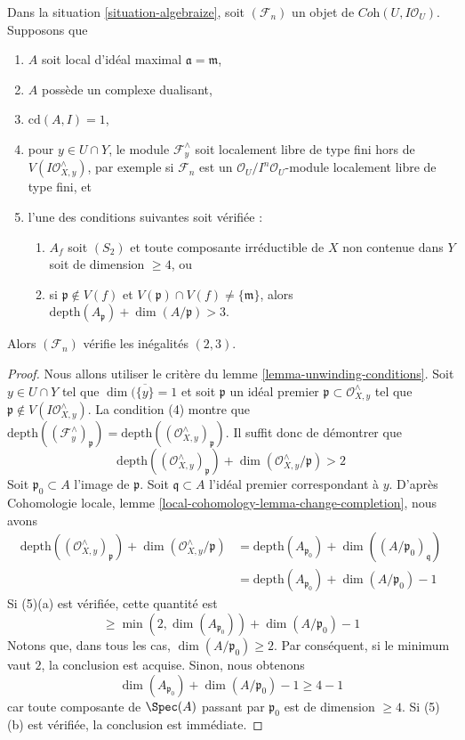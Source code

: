 \begin{lemma}
\label{lemma-unwinding-conditions-bis}
Dans la situation \ref{situation-algebraize}, soit $(\mathcal{F}_n)$ un objet
de $\textit{Coh}(U, I\mathcal{O}_U)$. Supposons que
\begin{enumerate}
\item $A$ soit local d'idéal maximal $\mathfrak a = \mathfrak m$,
\item $A$ possède un complexe dualisant,
\item $\text{cd}(A, I) = 1$,
\item pour $y \in U \cap Y$, le module $\mathcal{F}_y^\wedge$
soit localement libre de type fini hors de $V(I\mathcal{O}_{X, y}^\wedge)$,
par exemple si $\mathcal{F}_n$ est un
$\mathcal{O}_U/I^n\mathcal{O}_U$-module localement libre de type fini, et
\item l'une des conditions suivantes soit vérifiée :
\begin{enumerate}
\item $A_f$ soit $(S_2)$ et toute composante irréductible de $X$
non contenue dans $Y$ soit de dimension $\geq 4$, ou
\item si $\mathfrak p \not \in V(f)$ et
$V(\mathfrak p) \cap V(f) \not = \{\mathfrak m\}$, alors
$\text{depth}(A_\mathfrak p) + \dim(A/\mathfrak p) > 3$.
\end{enumerate}
\end{enumerate}
Alors $(\mathcal{F}_n)$ vérifie les inégalités $(2, 3)$.
\end{lemma}

\begin{proof}
Nous allons utiliser le critère du lemme \ref{lemma-unwinding-conditions}.
Soit $y \in U \cap Y$ tel que $\dim(\overline{\{y\}} = 1$ et soit
$\mathfrak p$ un idéal premier $\mathfrak p \subset \mathcal{O}_{X, y}^\wedge$ tel que
$\mathfrak p \not \in V(I\mathcal{O}_{X, y}^\wedge)$.
La condition (4) montre que
$\text{depth}((\mathcal{F}_y^\wedge)_\mathfrak p) =
\text{depth}((\mathcal{O}_{X, y}^\wedge)_\mathfrak p)$.
Il suffit donc de démontrer que
$$
\text{depth}((\mathcal{O}_{X, y}^\wedge)_\mathfrak p) +
\dim(\mathcal{O}_{X, y}^\wedge/\mathfrak p) > 2
$$
Soit $\mathfrak p_0 \subset A$ l'image de $\mathfrak p$.
Soit $\mathfrak q \subset A$ l'idéal premier correspondant à $y$.
D'après Cohomologie locale, lemme
\ref{local-cohomology-lemma-change-completion},
nous avons
\begin{align*}
\text{depth}((\mathcal{O}_{X, y}^\wedge)_\mathfrak p) +
\dim(\mathcal{O}_{X, y}^\wedge/\mathfrak p)
& =
\text{depth}(A_{\mathfrak p_0}) + \dim((A/\mathfrak p_0)_\mathfrak q) \\
& =
\text{depth}(A_{\mathfrak p_0}) + \dim(A/\mathfrak p_0) - 1
\end{align*}
Si (5)(a) est vérifiée, cette quantité est
$$
\geq \min(2, \dim(A_{\mathfrak p_0})) + \dim(A/\mathfrak p_0) - 1
$$
Notons que, dans tous les cas, $\dim(A/\mathfrak p_0) \geq 2$. Par conséquent, si
le minimum vaut $2$, la conclusion est acquise. Sinon, nous obtenons
$$
\dim(A_{\mathfrak p_0}) + \dim(A/\mathfrak p_0) - 1 \geq 4 - 1
$$
car toute composante de $\Spec(A)$ passant par $\mathfrak p_0$
est de dimension $\geq 4$. Si (5)(b) est vérifiée, la conclusion est immédiate.
\end{proof}


